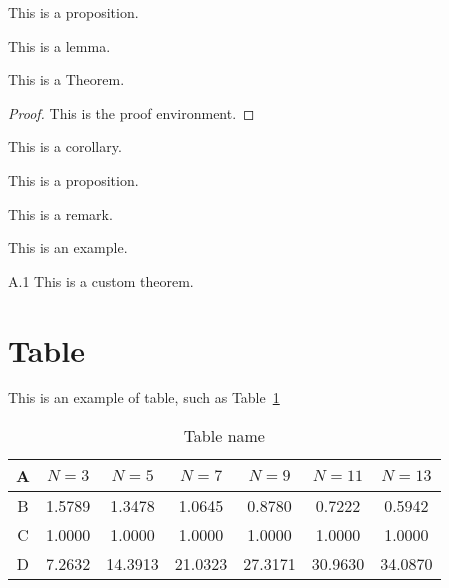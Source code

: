\documentclass[12pt,en]{homework}
\begin{document}
\begin{proposition}\label{prop:foo}
This is a proposition.
\end{proposition}

\begin{lemma}[Lemma]\label{lmm:foo}
This is a lemma.
\end{lemma}

\begin{theorem}[Theorem]\label{thm:foo}
This is a Theorem.
\end{theorem}
\begin{proof}
This is the proof environment.
\end{proof}

\begin{corollary}\label{cor:foo}
This is a corollary.
\end{corollary}

\begin{proposition}[Proposition]
This is a proposition.
\end{proposition}


\begin{remark}\label{rem:remark}
This is a remark.
\end{remark}

\begin{example}
This is an example.
\end{example}

\begin{ntheorem}{A.1}
This is a custom theorem.
\end{ntheorem}



\clearpage

\section*{Table}
This is an example of table, such as Table~\ref{tab:foo}

\begin{table}[htp!]
\centering
\setlength{\tabcolsep}{10pt}  %
\caption{Table name}
\label{tab:foo}
\begin{tabular}{ccccccc}
\toprule
A & $N=3$ & $N=5$ & $N=7$ & $N=9$ & $N=11$ & $N=13$ \\
\midrule
B & 1.5789 & 1.3478 &1.0645&0.8780 &0.7222 &0.5942  \\
C &  1.0000 &1.0000 &1.0000 &1.0000 &1.0000 &1.0000  \\
D &7.2632 &14.3913 &21.0323 &27.3171 &30.9630 &34.0870  \\
\bottomrule
\end{tabular}
\end{table}
\end{document}
